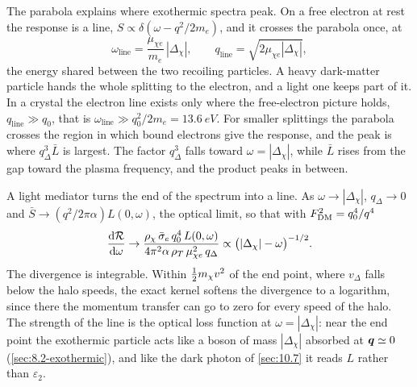 The parabola explains where exothermic spectra peak. On a free electron at rest the response is a line, $S \propto \delta(\omega - q^2/2m_e)$, and it crosses the parabola once, at
\begin{equation*}
  \omega_{\mathrm{line}} = \frac{\mu_{\chi e}}{m_e}\,|\Delta_\chi| , \qquad q_{\mathrm{line}} = \sqrt{2\mu_{\chi e}|\Delta_\chi|} ,
\end{equation*}
the energy shared between the two recoiling particles. A heavy dark-matter particle hands the whole splitting to the electron, and a light one keeps part of it. In a crystal the electron line exists only where the free-electron picture holds, $q_{\mathrm{line}} \gg q_0$, that is $\omega_{\mathrm{line}} \gg q_0^2/2m_e = \SI{13.6}{eV}$. For smaller splittings the parabola crosses the region in which bound electrons give the response, and the peak is where $q_\Delta^3\bar L$ is largest. The factor $q_\Delta^3$ falls toward $\omega = |\Delta_\chi|$, while $\bar L$ rises from the gap toward the plasma frequency, and the product peaks in between.

A light mediator turns the end of the spectrum into a line. As $\omega \to |\Delta_\chi|$, $q_\Delta \to 0$ and $\bar S \to (q^2/2\pi\alpha)L(0,\omega)$, the optical limit, so that with $F_{\mathrm{DM}}^2 = q_0^4/q^4$
\begin{equation}
  \frac{\mathrm{d}\mathcal{R}}{\mathrm{d}\omega} \to \frac{\rho_\chi\,\bar{\sigma}_{e}\,q_0^4\,L(0,\omega)}{4\pi^2\alpha\,\rho_T\,\mu_{\chi e}^2\,q_\Delta} \propto \bigl(|\Delta_\chi| - \omega\bigr)^{-1/2} .
  \label{eq:10.9-edge}
\end{equation}
The divergence is integrable. Within $\tfrac12m_{\chi} v^2$ of the end point, where $v_\Delta$ falls below the halo speeds, the exact kernel softens the divergence to a logarithm, since there the momentum transfer can go to zero for every speed of the halo. The strength of the line is the optical loss function at $\omega = |\Delta_\chi|$: near the end point the exothermic particle acts like a boson of mass $|\Delta_\chi|$ absorbed at $\bm{q} \simeq 0$ (\cref{sec:8.2-exothermic}), and like the dark photon of \cref{sec:10.7} it reads $L$ rather than $\varepsilon_2$.

